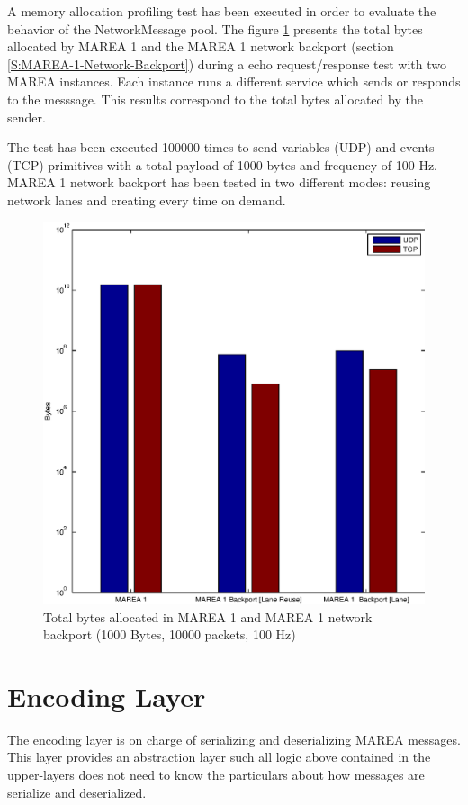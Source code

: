 A memory allocation profiling test has been executed in order to evaluate the behavior of the NetworkMessage pool. The figure \ref{fig:pool-memory-allocation} presents the total bytes allocated by MAREA 1 and the MAREA 1 network backport (section \ref{S:MAREA-1-Network-Backport}) during a echo request/response test with two MAREA instances. Each instance runs a different service which sends or responds to the messsage. This results correspond to the total bytes allocated by the sender.

The test has been executed 100000 times to send variables (UDP) and events (TCP) primitives with a total payload of 1000 bytes and frequency of 100 Hz. MAREA 1 network backport has been tested in two different modes: reusing network lanes and creating every time on demand. 

\begin{figure}[H]\begin{center}
 \centering
  \captionsetup{justification=centering}
  \includegraphics[scale=0.6]{pictures/network/MemoryAllocationBackport}
  \caption{Total bytes allocated in MAREA 1 and MAREA 1 network backport (1000 Bytes, 10000 packets, 100 Hz) \label{fig:pool-memory-allocation}}
\end{center}\end{figure}

\section{Encoding Layer}\label{S:Encoding-Layer}
The encoding layer is on charge of serializing and deserializing MAREA messages. This layer provides an abstraction layer such all logic above contained in the upper-layers does not need to know the particulars about how messages are serialize and deserialized.

